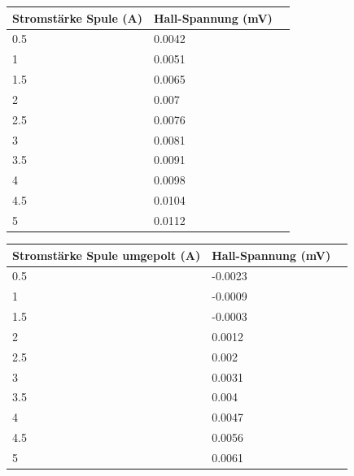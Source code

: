 \documentclass[titlepage=firstcover, captions=tableheading]{scrartcl}
\begin{document}
\begin{center}
    \begin{tabular}{lll}
        \toprule
        Stromstärke Spule (A) & Hall-Spannung (mV) \\
        \midrule 
          0.5      & 0.0042\\
          1        & 0.0051\\
          1.5      & 0.0065\\ 
          2        & 0.007\\ 
          2.5      & 0.0076\\ 
          3        & 0.0081\\ 
          3.5      & 0.0091\\ 
          4        & 0.0098\\ 
          4.5      & 0.0104\\ 
          5        & 0.0112\\ 
        \bottomrule
    \end{tabular}
\end{center}

\begin{center}
    \begin{tabular}{lll}
        \toprule
        Stromstärke Spule umgepolt (A) & Hall-Spannung (mV) \\
        \midrule 
          0.5      &  -0.0023\\
          1        &  -0.0009\\
          1.5      &  -0.0003\\ 
          2        &  0.0012\\ 
          2.5      &  0.002\\ 
          3        &  0.0031\\ 
          3.5      &  0.004\\ 
          4        &  0.0047\\ 
          4.5      &  0.0056\\ 
          5        &  0.0061 \\ 
        \bottomrule
    \end{tabular}
\end{center}
\end{document}
